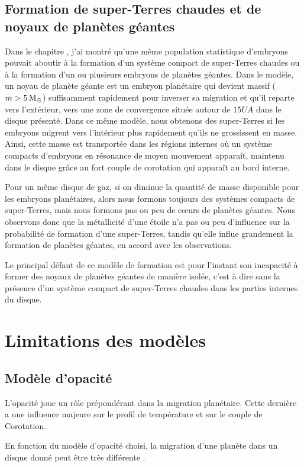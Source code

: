 \subsection{Formation de super-Terres chaudes et de noyaux de planètes géantes}
Dans le chapitre , j'ai montré qu'une même population statistique d'embryons pouvait aboutir à la formation d'un système compact de super-Terres chaudes ou à la formation d'un ou plusieurs embryons de planètes géantes. Dans le modèle, un noyau de planète géante est un embryon planétaire qui devient massif ($m>5\mathrm{\thinspace M_\oplus}$) suffisamment rapidement pour inverser sa migration et qu'il reparte vers l'extérieur, vers une zone de convergence située autour de $15\unit{UA}$ dans le disque présenté. Dans ce même modèle, nous obtenons des super-Terres si les embryons migrent vers l'intérieur plus rapidement qu'ils ne grossissent en masse. Ainsi, cette masse est transportée dans les régions internes où un système compacts d'embryons en résonance de moyen mouvement apparaît, maintenu dans le disque grâce au fort couple de corotation qui apparaît au bord interne.

Pour un même disque de gaz, si on diminue la quantité de masse disponible pour les embryons planétaires, alors nous formons toujours des systèmes compacts de super-Terres, mais nous formons pas ou peu de cœurs de planètes géantes. Nous observons donc que la métallicité d'une étoile n'a pas ou peu d'influence sur la probabilité de formation d'une super-Terres, tandis qu'elle influe grandement la formation de planètes géantes, en accord avec les observations. 

Le principal défaut de ce modèle de formation est pour l'instant son incapacité à former des noyaux de planètes géantes de manière isolée, c'est à dire sans la présence d'un système compact de super-Terres chaudes dans les parties internes du disque. 

\section{Limitations des modèles}
\subsection{Modèle d'opacité}
L'opacité joue un rôle prépondérant dans la migration planétaire. Cette dernière a une influence majeure sur le profil de température et sur le couple de Corotation. 

En fonction du modèle d'opacité choisi, la migration d'une planète dans un disque donné peut être très différente . 

